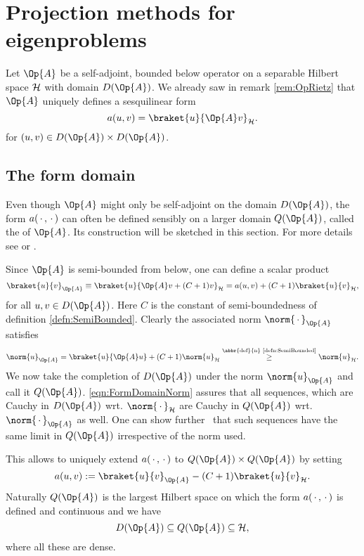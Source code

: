 \section{Projection methods for eigenproblems}
\label{sec:Projection}

Let $\Op{A}$ be a self-adjoint, bounded below operator on a separable Hilbert space
$\mathcal{H}$ with domain $D(\Op{A})$.
We already saw in remark \vref{rem:OpRietz}
that $\Op{A}$ uniquely defines a sesquilinear form
\[ a(u, v) = \braket{u}{\Op{A} v}_\hilbert. \]
for $(u, v) \in D(\Op{A}) \times D(\Op{A})$.

\subsection{The form domain}
Even though $\Op{A}$ might only be self-adjoint on the domain $D(\Op{A})$,
the form $a(\,\cdot\,, \,\cdot\,)$ can often be defined sensibly
on a larger domain $Q(\Op{A})$, called the  of $\Op{A}$.
Its construction will be sketched in this section.
For more details see \cite[p. 77]{Teschl2014} or \cite[p. 276]{Reed1980}.

\noindent
Since $\Op{A}$ is semi-bounded from below, one can define a scalar product
\[
	\braket{u}{v}_{\Op{A}} \equiv \braket{u}{\Op{A} v + (C + 1) v}_{\hilbert}
	= a(u, v) + (C+1) \braket{u}{v}_{\hilbert},
\]
for all $u,v \in D(\Op{A})$.
Here $C$ is the constant of semi-boundedness of definition \vref{defn:SemiBounded}.
Clearly the associated norm $\norm{\slot}_{\Op{A}}$ satisfies
\begin{equation}
	\label{eqn:FormDomainNorm}
\norm{u}_{\Op{A}}
= \braket{u}{\Op{A} u} + (C+1) \norm{u}_{\hilbert}
\stackrel{\text{\abbr{def}{n} \ref{defn:SemiBounded}}}{\geq} \norm{u}_{\hilbert}.
\end{equation}
We now take the completion of $D(\Op{A})$ under the norm $\norm{u}_{\Op{A}}$
and call it $Q(\Op{A})$.
\eqref{eqn:FormDomainNorm} assures that all sequences,
which are Cauchy in $D(\Op{A})$ wrt. $\norm{\slot}_{\hilbert}$
are Cauchy in $Q(\Op{A})$ wrt. $\norm{\slot}_{\Op{A}}$ as well.
One can show further~\cite{Teschl2014} that such sequences
have the same limit in $Q(\Op{A})$ irrespective of the norm used.

\noindent
This allows to uniquely
extend $a(\,\cdot\,, \,\cdot\,)$ to $Q(\Op{A}) \times Q(\Op{A})$ by setting
\[ a(u, v) := \braket{u}{v}_{\Op{A}} - (C+1) \braket{u}{v}_{\hilbert}. \]
Naturally $Q(\Op{A})$ is the largest Hilbert space on which the form
$a(\,\cdot\,, \,\cdot\,)$ is defined and continuous
and we have
\[ D(\Op{A}) \subseteq Q(\Op{A}) \subseteq \hilbert, \]
where all these are dense.

